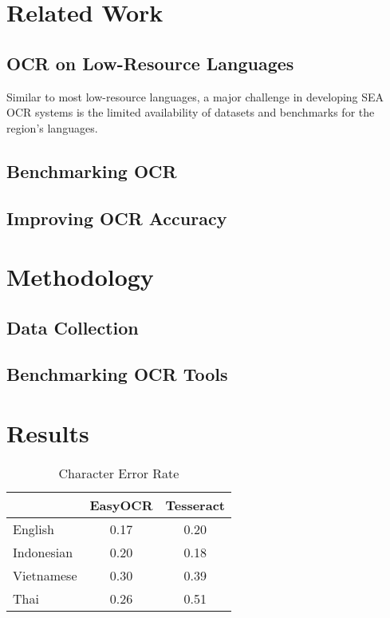 \documentclass[12pt,oneside]{memoir}
\begin{document}
\chapter{Related Work}

\section{OCR on Low-Resource Languages}
Similar to most low-resource languages, a major challenge in developing SEA OCR systems is the limited availability of datasets and benchmarks for the region’s languages.

\parencite{ignat-etal-2022}
\section{Benchmarking OCR}

\section{Improving OCR Accuracy}

\chapter{Methodology}

\section{Data Collection}

\section{Benchmarking OCR Tools}
\parencite{smith-2013}

\chapter{Results}

\begin{table}[h]
    \centering
    \begin{tabular}{|l|c|c|}
        \hline
        & EasyOCR & Tesseract \\
        \hline
        English & 0.17 & 0.20\\
        Indonesian & 0.20& 0.18\\
        Vietnamese & 0.30& 0.39\\
        Thai & 0.26 & 0.51\\
        \hline
    \end{tabular}
    \caption{Character Error Rate}
\end{table}
\end{document}
